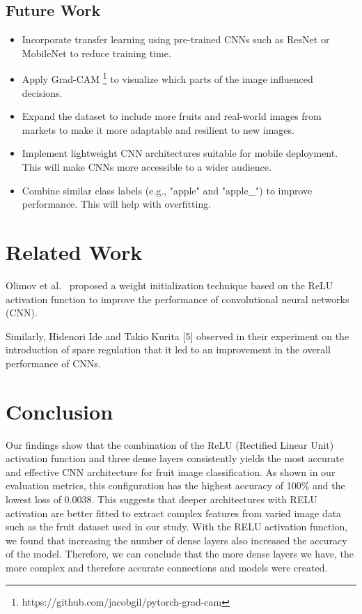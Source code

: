 \documentclass[conference]{IEEEtran}
\begin{document}
\subsection{Future Work}
\begin{itemize}
  \item Incorporate transfer learning using pre-trained CNNs such as ResNet or MobileNet to reduce training time.
  \item Apply Grad-CAM \footnote{https://github.com/jacobgil/pytorch-grad-cam} to visualize which parts of the image influenced decisions.
  \item Expand the dataset to include more fruits and real-world images from markets to make it more adaptable and resilient to new images. 
  \item Implement lightweight CNN architectures suitable for mobile deployment. This will make CNNs more accessible to a wider audience.
  \item Combine similar class labels (e.g., "apple" and "apple\_") to improve performance. This will help with overfitting.
\end{itemize}
\section{Related Work}
Olimov et al.~\cite{b8} proposed a weight initialization technique based on the ReLU activation function to improve the performance of convolutional neural networks (CNN).

Similarly, Hidenori Ide and Takio Kurita [5] observed in their experiment on the introduction of spare regulation that it led to an improvement in the overall performance of CNNs.

\section{Conclusion}
Our findings show that the combination of the ReLU (Rectified Linear Unit) activation function and three dense layers consistently yields the most accurate and effective CNN architecture for fruit image classification. As shown in our evaluation metrics, this configuration has the highest accuracy of 100\% and the lowest loss of 0.0038. This suggests that deeper architectures with RELU activation are better fitted to extract complex features from varied image data such as the fruit dataset used in our study. With the RELU activation function, we found that increasing the number of dense layers also increased the accuracy of the model. Therefore, we can conclude that the more dense layers we have, the more complex and therefore accurate connections and models were created. 
\end{document}
